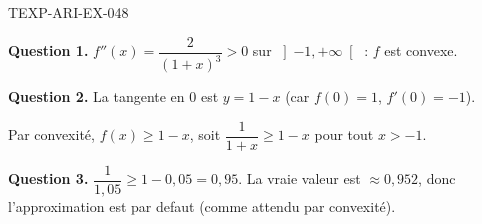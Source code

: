 \begin{corrige}{TEXP-ARI-EX-048}

\textbf{Question 1.} $f''(x) = \dfrac{2}{(1+x)^3} > 0$ sur $\left]-1, +\infty\right[$ : $f$ est convexe.

\commentaireMarge{$f''=2/(1+x)^3 > 0$ sur $]-1,+\infty[$ : convexe, courbe au-dessus des tangentes.}

\textbf{Question 2.} La tangente en $0$ est $y = 1 - x$ (car $f(0)=1$, $f'(0)=-1$).

Par convexité, $f(x) \geq 1 - x$, soit $\dfrac{1}{1+x} \geq 1 - x$ pour tout $x > -1$.

\textbf{Question 3.} $\dfrac{1}{1{,}05} \geq 1 - 0{,}05 = 0{,}95$. La vraie valeur est $\approx 0{,}952$, donc l'approximation est par defaut (comme attendu par convexité).

\end{corrige}
